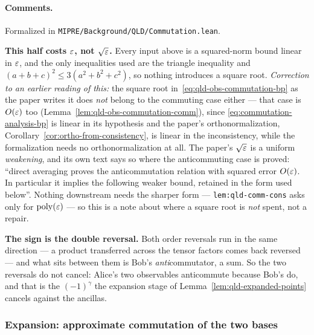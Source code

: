 \paragraph{Comments.} Formalized in \texttt{MIPRE/Background/QLD/Commutation.lean}.

\textbf{This half costs $\varepsilon$, not $\sqrt{\varepsilon}$.} Every input above is a squared-norm bound
linear in $\varepsilon$, and the only inequalities used are the triangle inequality and
$(a+b+c)^2 \leq 3(a^2+b^2+c^2)$, so nothing introduces a square root. \emph{Correction to an
earlier reading of this:} the square root in~\eqref{eq:qld-obs-commutation-bp} as the paper writes
it does \emph{not} belong to the commuting case either --- that case is $O(\varepsilon)$ too
(Lemma~\ref{lem:qld-obs-commutation-comm}), since \eqref{eq:commutation-analysis-bp} is linear in
its hypothesis and the paper's orthonormalization, Corollary~\ref{cor:ortho-from-consistency}, is
linear in the inconsistency, while the formalization needs no orthonormalization at all. The
paper's $\sqrt{\varepsilon}$ is a uniform \emph{weakening}, and its own text says so where the
anticommuting case is proved: ``direct averaging proves the anticommutation relation with squared
error $O(\varepsilon)$. In particular it implies the following weaker bound, retained in the form used
below''. Nothing downstream needs the sharper form --- \texttt{lem:qld-comm-cons} asks only for
$\mathrm{poly}(\varepsilon)$ --- so this is a note about where a square root is \emph{not} spent, not a repair.

\textbf{The sign is the double reversal.} Both order reversals run in the same direction --- a
product transferred across the tensor factors comes back reversed --- and what sits between them
is Bob's \emph{anti}commutator, a sum. So the two reversals do not cancel: Alice's two observables
anticommute because Bob's do, and that is the $(-1)^{\gamma}$ the expansion stage of
Lemma~\ref{lem:qld-expanded-points} cancels against the ancillas.

\subsubsection{Expansion: approximate commutation of the two bases}

\effortHard

